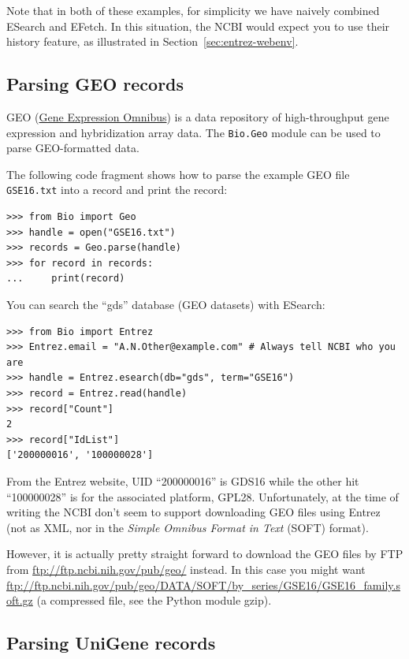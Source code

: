 \documentclass{report}
\begin{document}
Note that in both of these examples, for simplicity we have naively combined ESearch and EFetch.
In this situation, the NCBI would expect you to use their history feature,
as illustrated in Section~\ref{sec:entrez-webenv}.


\subsection{Parsing GEO records}

GEO (\href{http://www.ncbi.nlm.nih.gov/geo/}{Gene Expression Omnibus})
is a data repository of high-throughput gene expression and hybridization
array data. The \verb|Bio.Geo| module can be used to parse GEO-formatted
data.

The following code fragment shows how to parse the example GEO file
\verb|GSE16.txt| into a record and print the record:

\begin{verbatim}
>>> from Bio import Geo
>>> handle = open("GSE16.txt")
>>> records = Geo.parse(handle)
>>> for record in records:
...     print(record)
\end{verbatim}

You can search the ``gds'' database (GEO datasets) with ESearch:

\begin{verbatim}
>>> from Bio import Entrez
>>> Entrez.email = "A.N.Other@example.com" # Always tell NCBI who you are
>>> handle = Entrez.esearch(db="gds", term="GSE16")
>>> record = Entrez.read(handle)
>>> record["Count"]
2
>>> record["IdList"]
['200000016', '100000028']
\end{verbatim}

From the Entrez website, UID ``200000016'' is GDS16 while the other hit
``100000028'' is for the associated platform, GPL28.  Unfortunately, at the
time of writing the NCBI don't seem to support downloading GEO files using
Entrez (not as XML, nor in the \textit{Simple Omnibus Format in Text} (SOFT)
format).

However, it is actually pretty straight forward to download the GEO files by FTP
from \url{ftp://ftp.ncbi.nih.gov/pub/geo/} instead.  In this case you might want
\url{ftp://ftp.ncbi.nih.gov/pub/geo/DATA/SOFT/by_series/GSE16/GSE16_family.soft.gz}
(a compressed file, see the Python module gzip).

\subsection{Parsing UniGene records}
\end{document}
